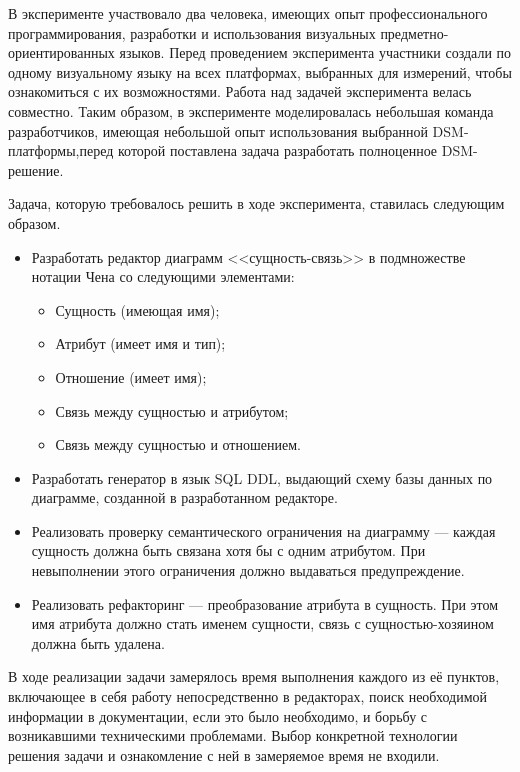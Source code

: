 В эксперименте участвовало два человека, имеющих опыт профессионального программирования,
разработки и использования визуальных предметно-ориентированных языков. Перед проведением
эксперимента участники создали по одному визуальному языку на всех платформах, выбранных
для измерений, чтобы ознакомиться с их возможностями. Работа над задачей эксперимента
велась совместно. Таким образом, в эксперименте моделировалась небольшая команда разработчиков, 
имеющая небольшой опыт использования выбранной \ac{DSM}-платформы,перед которой поставлена 
задача разработать полноценное \ac{DSM}-решение.

Задача, которую требовалось решить в ходе эксперимента, ставилась следующим образом.
\begin{itemize}
	\item Разработать редактор диаграмм <<сущность-связь>> в подмножестве нотации Чена со
		следующими элементами:
		\begin{itemize}
			\item Сущность (имеющая имя);
			\item Атрибут (имеет имя и тип);
			\item Отношение (имеет имя);
			\item Связь между сущностью и атрибутом;
			\item Связь между сущностью и отношением.
		\end{itemize}
	\item Разработать генератор в язык \ac{SQL} \ac{DDL}, выдающий схему базы данных по 
		диаграмме, созданной в разработанном редакторе.
	\item Реализовать проверку семантического ограничения на диаграмму --- каждая сущность
		должна быть связана хотя бы с одним атрибутом. При невыполнении этого ограничения должно 
		выдаваться предупреждение.
	\item Реализовать рефакторинг --- преобразование атрибута в сущность. При этом имя атрибута 
		должно стать именем сущности, связь с сущностью-хозяином должна быть удалена.
\end{itemize}

В ходе реализации задачи замерялось время выполнения каждого из её пунктов, включающее
в себя работу непосредственно в редакторах, поиск необходимой информации в документации, если это было необходимо, 
и борьбу с возникавшими техническими проблемами. Выбор конкретной технологии решения задачи 
и ознакомление с ней в замеряемое время не входили.

